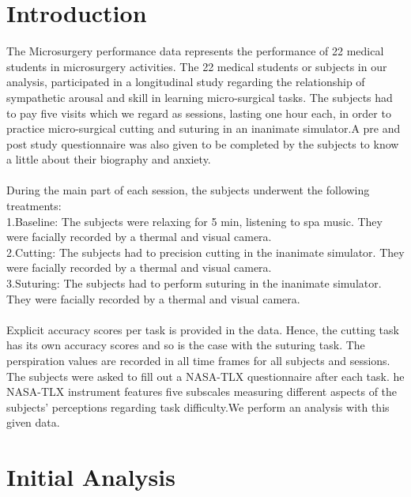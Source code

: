 \documentclass[12pt,epsf]{report}
\begin{document}
\section*{Introduction}
{The Microsurgery performance data represents the performance of 22 medical students in microsurgery activities. The 22 medical students or subjects in our analysis, participated in a longitudinal study regarding the relationship of sympathetic arousal and skill in learning micro-surgical tasks. The subjects had to pay five visits which we regard as sessions, lasting one hour each, in order to practice micro-surgical cutting and suturing in an inanimate simulator.A pre and post study questionnaire was also given to be completed by the subjects to know a little about their biography and anxiety.\\
\\
During the main part of each session, the subjects underwent the following treatments:\\
1.Baseline: The subjects were relaxing for 5 min, listening to spa music. They were facially recorded by a thermal and visual camera.\\
2.Cutting: The subjects had to precision cutting in the inanimate simulator. They were facially recorded by a thermal and visual camera.\\
3.Suturing: The subjects had to perform suturing in the inanimate simulator. They were facially recorded by a thermal and visual camera.\\
\\
Explicit accuracy scores per task is provided in the data. Hence, the cutting task has its own accuracy scores and so is the case with the suturing task. The perspiration values are recorded in all time frames for all subjects and sessions. The subjects were asked to fill out a  NASA-TLX questionnaire after each task. he NASA-TLX instrument features five subscales measuring different aspects of the subjects' perceptions regarding task difficulty.We perform an analysis with this given data.\\   }

\newpage
\section*{Initial Analysis}
\end{document}
